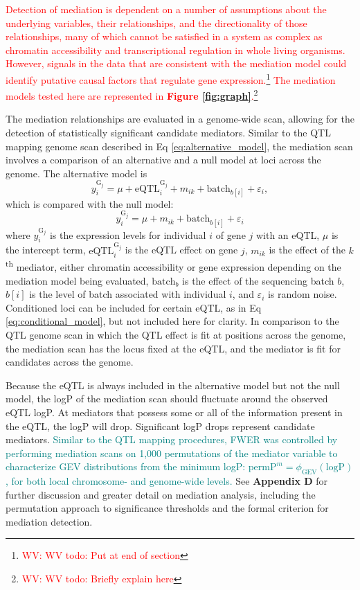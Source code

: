 \documentclass[9pt,twocolumn,twoside]{gsajnl}
\newcommand{\permpmed}{\text{permP}^{m}}
\newcommand{\WV}[2]{\textcolor{red}{#1\footnote{\textcolor{red}{WV: #2}}}}
\newcommand{\GKinline}[1]{\textcolor{teal}{#1}}
\begin{document}
\WV{Detection of mediation is dependent on a number of assumptions about the underlying variables, their relationships, and the directionality of those relationships, many of which cannot be satisfied in a system as complex as chromatin accessibility and transcriptional regulation in whole living organisms. However, signals in the data that are consistent with the mediation model could identify putative causal factors that regulate gene expression.}{WV todo: Put at end of section} \WV{The mediation models tested here are represented in \textbf{Figure \ref{fig:graph}}.}{WV todo: Briefly explain here}

The mediation relationships are evaluated in a genome-wide scan, allowing for the detection of statistically significant candidate mediators. Similar to the QTL mapping genome scan described in Eq \ref{eq:alternative_model}, the mediation scan involves a comparison of an alternative and a null model at loci across the genome. The alternative model is
\begin{equation}
y^{\text{G}_{j}}_{i} = \mu + \text{eQTL}_{i}^{\text{G}_{j}} + m_{ik} + \text{batch}_{b[i]} + \varepsilon_{i},
\label{eq:mediation_alt}
\end{equation}
which is compared with the null model:
\begin{equation}
y^{\text{G}_{j}}_{i} = \mu + m_{ik} \nonumber + \text{batch}_{b[i]} + \varepsilon_{i}
\label{eq:mediation_null}
\end{equation}
where $y^{\text{G}_{j}}_{i}$ is the expression levels for individual $i$ of gene $j$ with an eQTL, $\mu$ is the intercept term, $\text{eQTL}_{i}^{\text{G}_{j}}$ is the eQTL effect on gene $j$, $m_{ik}$ is the effect of the $k$\textsuperscript{th} mediator, either chromatin accessibility or gene expression depending on the mediation model being evaluated, $\text{batch}_{b}$ is the effect of the sequencing batch $b$, $b[i]$ is the level of batch associated with individual $i$, and $\varepsilon_{i}$ is random noise. Conditioned loci can be included for certain eQTL, as in Eq \ref{eq:conditional_model}, but not included here for clarity. In comparison to the QTL genome scan in which the QTL effect is fit at positions across the genome, the mediation scan has the locus fixed at the eQTL, and the mediator is fit for candidates across the genome.

Because the eQTL is always included in the alternative model but not the null model, the logP of the mediation scan should fluctuate around the observed eQTL logP. At mediators that possess some or all of the information present in the eQTL, the logP will drop. Significant logP drops represent candidate mediators. \GKinline{Similar to the QTL mapping procedures, FWER was controlled by performing mediation scans on 1,000 permutations of the mediator variable to characterize GEV distributions from the minimum logP: $\permpmed = \phi_{\text{GEV}}(\text{logP})$, for both local chromosome- and genome-wide levels.} See \textbf{Appendix D} for further discussion and greater detail on mediation analysis, including the permutation approach to significance thresholds and the formal criterion for mediation detection.
\end{document}
